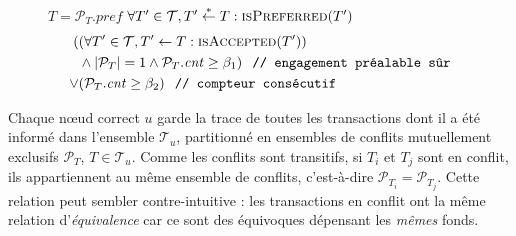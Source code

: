 \begin{figure}[t]
\begin{center}
\small
\begin{algorithmic}[1]
        \State \Return $T = \mathcal{P}_T\mathit{.pref}$
    \EndFunction
        \State \Return $\forall T'\in\mathcal{T}, T' \stackrel{*}{\gets} T: \Call{isPreferred}{T'}$
    \EndFunction
        \State\Return
            \vspace*{-.5\baselineskip}
        \begin{align*}
            (&(\forall T' \in \mathcal{T}, T' \gets T: \Call{isAccepted}{T'}) \\
                &\land |\mathcal{P}_T| = 1 \land \mathcal{P}_T\mathit{.cnt} \ge \beta_1) \texttt{\hspace{.1in}// engagement préalable sûr} \\
            \lor &(%
            \mathcal{P}_T\mathit{.cnt} \ge \beta_2)\texttt{\hspace{.1in}// compteur consécutif}
        \end{align*}
    \EndFunction
        \State {}
        \State {}
    \EndProcedure
    \label{fig:gossipchain-onquery}
\end{algorithmic}
\end{center}
\end{figure}

Chaque nœud correct $u$ garde la trace de toutes les transactions dont il a été informé dans l'ensemble $\mathcal{T}_u$, partitionné en ensembles de conflits mutuellement exclusifs $\mathcal{P}_T$, $T \in \mathcal{T}_u$.
Comme les conflits sont transitifs, si $T_i$ et $T_j$ sont en conflit, ils appartiennent au même ensemble de conflits, c'est-à-dire $\mathcal{P}_{T_i} = \mathcal{P}_{T_j}$. Cette relation peut sembler contre-intuitive : les transactions en conflit ont la même relation d'\emph{équivalence} car ce sont des équivoques dépensant les \emph{mêmes} fonds.

